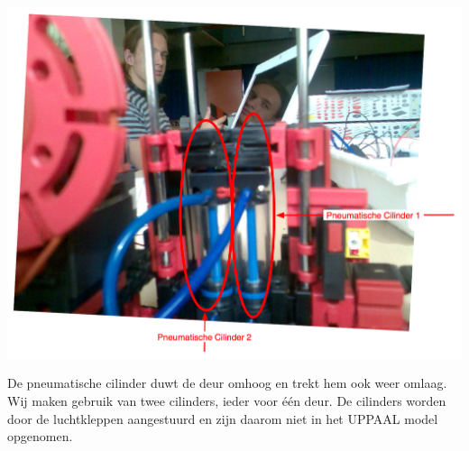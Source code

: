 \includegraphics[width=15cm, height=11cm]{PC} \\
De pneumatische cilinder duwt de deur omhoog en trekt hem ook weer omlaag. Wij maken gebruik van twee cilinders, ieder voor \'e\'en deur. De cilinders worden door de luchtkleppen aangestuurd en zijn daarom niet in het UPPAAL model opgenomen.


